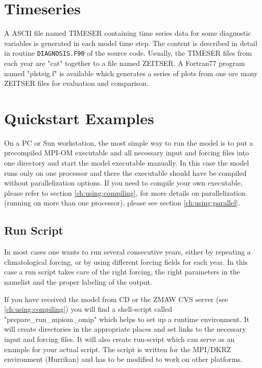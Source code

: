 \section{Timeseries}

A ASCII file named TIMESER containing time series data for some diagnostic variables is generated in
each model time step. The content is described in detail in routine \texttt{DIAGNOSIS.F90} of the source code. 
Usually, the TIMESER files from each year are "cat" together to a file named ZEITSER.
A Fortran77 program named "plsteig.f" is available which generates a series of plots from one ore many 
ZEITSER files for evaluation and comparison.


\section{Quickstart Examples}
\label{ch:using:quickstart}

On a PC or Sun workstation, the most simple way to run the model is to put a precompiled MPI-OM executable and all
necessary input and forcing files into one directory and start the model executable manually. In this
case the model runs only on one processor and there the executable should have be compiled without parallelization options.
If you need to compile your own executable, please refer to section \ref{ch:using:compiling},
for more details on parallelization (running on more than one processor), please see section \ref{ch:using:parallel}.

\subsection{Run Script}

In most cases one wants to run several consecutive years, either by repeating a climatological forcing,
or by using different forcing fields for each year. In this case a run script takes care of 
the right forcing, the right parameters in the namelist and the proper labeling of the output.

If you have received the model from CD or the ZMAW CVS server (see \ref{ch:using:compiling}) 
you will find a shell-script called "prepare\_run\_mpiom\_omip" which helps to set up
a runtime environment. It will create directories in the appropriate places and 
set links to the necessary input and forcing files. It will also create run-script 
which can serve as an example for your actual script. The script is written for the 
MPI/DKRZ environment (Hurrikan) and has to be modified to work on other platforms.


